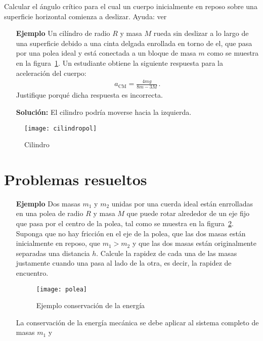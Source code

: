\ejercicio{}
Calcular el ángulo crítico para el cual un cuerpo inicialmente en reposo sobre una superficie horizontal comienza a deslizar. Ayuda: ver 




\begin{itemize}
\item[\textbf{Ejemplo}]     Un cilíndro de radio $R$ y masa $M$ rueda sin deslizar a lo largo
    de una superficie debido a una cinta delgada enrollada en torno de
    el, que pasa por una polea ideal y está conectada a un bloque de
    masa $m$ como se muestra en la figura~\ref{fig:cilindropol}. Un estudiante obtiene la siguiente respuesta para la aceleración del cuerpo:
    \begin{align*}
      a_{\text{CM}}=\frac{4mg}{8m-3M}\,.
    \end{align*}
Justifique porqué dicha respuesta es incorrecta. 



\item[\textbf{Solución:}] El cilindro podría moverse hacia la izquierda.


\end{itemize}

\begin{figure}
  \centering
  \texttt{[image: cilindropol]}
  \caption{Cilindro}
  \label{fig:cilindropol}
\end{figure}

\section{Problemas resueltos}

\begin{itemize}
\item[\textbf{Ejemplo}] Dos masas $m_1$ y $m_2$ unidas por una cuerda ideal están enrrolladas en una polea de radio $R$ y masa $M$ que puede rotar alrededor de un eje fijo que pasa por el centro de la polea, tal como se muestra en la figura~\ref{fig:polea}. Suponga que no hay fricción en el eje de la polea, que las dos masas están inicialmente en reposo, que $m_1 > m_2$ y que las dos masas están originalmente separadas una distancia $h$. Calcule la rapidez de cada una de las masas justamente cuando una pasa al lado de la otra, es decir, la rapidez de encuentro.

  \begin{figure}
    \centering
    \texttt{[image: polea]}
    \caption{Ejemplo conservación de la energía}
    \label{fig:polea}
  \end{figure}
La conservación de la energía mecánica se debe aplicar al sistema completo de masas $m_1$ y 
\end{itemize}




